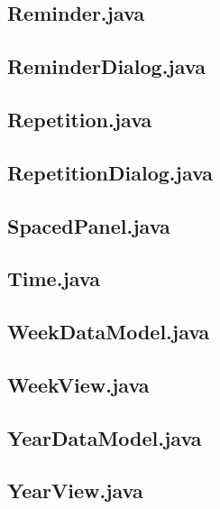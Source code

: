 \documentclass{article}
\begin{document}


\subsection{Reminder.java}



\subsection{ReminderDialog.java}



\subsection{Repetition.java}



\subsection{RepetitionDialog.java}



\subsection{SpacedPanel.java}



\subsection{Time.java}



\subsection{WeekDataModel.java}



\subsection{WeekView.java}



\subsection{YearDataModel.java}



\subsection{YearView.java}


\end{document}
